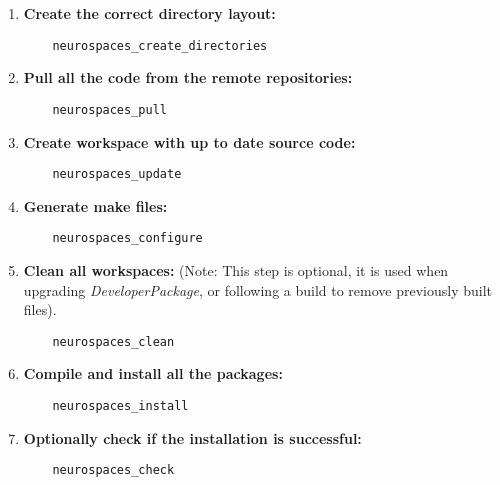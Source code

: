 \documentclass[12pt]{article}
\begin{document}
\begin{enumerate}
\item {\bf Create the correct directory layout:}
\begin{verbatim}
	neurospaces_create_directories
\end{verbatim}
  
\item {\bf Pull all the code from the remote repositories:}
\begin{verbatim}
	neurospaces_pull
\end{verbatim}

\item {\bf Create workspace with up to date source code:}
\begin{verbatim}
	neurospaces_update
\end{verbatim}

\item {\bf Generate make files:}
\begin{verbatim}
	neurospaces_configure
\end{verbatim}

\item {\bf Clean all workspaces:} (Note: This step is optional, it is used when upgrading {\it DeveloperPackage}, or following a build to remove previously built files).
\begin{verbatim}
	neurospaces_clean
\end{verbatim}

\item {\bf Compile and install all the packages:}
\begin{verbatim}
	neurospaces_install
\end{verbatim}

\item {\bf Optionally check if the installation is successful:}
\begin{verbatim}
	neurospaces_check
\end{verbatim}

\end{enumerate}


\end{document}
